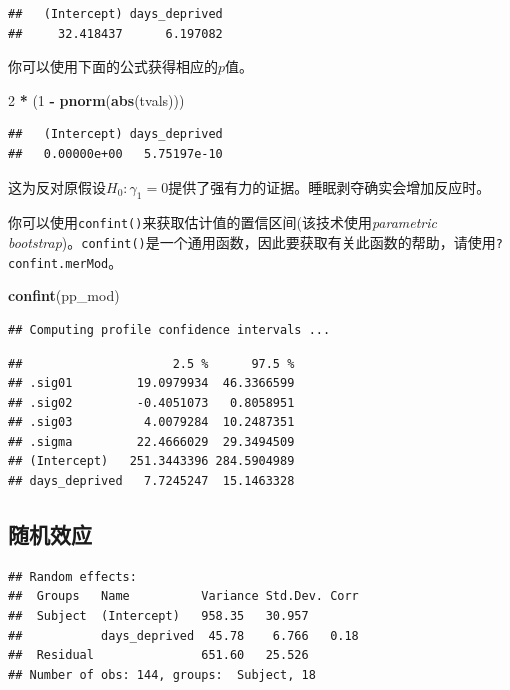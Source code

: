 \documentclass[
]{book}
\newenvironment{Shaded}{\begin{snugshade}}{\end{snugshade}}
\newcommand{\DecValTok}[1]{\textcolor[rgb]{0.00,0.00,0.81}{#1}}
\newcommand{\FunctionTok}[1]{\textcolor[rgb]{0.13,0.29,0.53}{\textbf{#1}}}
\newcommand{\NormalTok}[1]{#1}
\newcommand{\SpecialCharTok}[1]{\textcolor[rgb]{0.81,0.36,0.00}{\textbf{#1}}}
\begin{document}
\begin{verbatim}
##   (Intercept) days_deprived 
##     32.418437      6.197082
\end{verbatim}

你可以使用下面的公式获得相应的\(p\)值。

\begin{Shaded}
\begin{Highlighting}[]
\DecValTok{2} \SpecialCharTok{*}\NormalTok{ (}\DecValTok{1} \SpecialCharTok{{-}} \FunctionTok{pnorm}\NormalTok{(}\FunctionTok{abs}\NormalTok{(tvals)))}
\end{Highlighting}
\end{Shaded}

\begin{verbatim}
##   (Intercept) days_deprived 
##   0.00000e+00   5.75197e-10
\end{verbatim}

这为反对原假设\(H_0: \gamma_1 = 0\)提供了强有力的证据。睡眠剥夺确实会增加反应时。

你可以使用\texttt{confint()}来获取估计值的置信区间(该技术使用\emph{parametric bootstrap})。\texttt{confint()}是一个通用函数，因此要获取有关此函数的帮助，请使用\texttt{?confint.merMod}。

\begin{Shaded}
\begin{Highlighting}[]
\FunctionTok{confint}\NormalTok{(pp\_mod)}
\end{Highlighting}
\end{Shaded}

\begin{verbatim}
## Computing profile confidence intervals ...
\end{verbatim}

\begin{verbatim}
##                     2.5 %      97.5 %
## .sig01         19.0979934  46.3366599
## .sig02         -0.4051073   0.8058951
## .sig03          4.0079284  10.2487351
## .sigma         22.4666029  29.3494509
## (Intercept)   251.3443396 284.5904989
## days_deprived   7.7245247  15.1463328
\end{verbatim}

\hypertarget{ux968fux673aux6548ux5e94}{%
\subsection{随机效应}\label{ux968fux673aux6548ux5e94}}

\begin{verbatim}
## Random effects:
##  Groups   Name          Variance Std.Dev. Corr
##  Subject  (Intercept)   958.35   30.957       
##           days_deprived  45.78    6.766   0.18
##  Residual               651.60   25.526       
## Number of obs: 144, groups:  Subject, 18
\end{verbatim}
\end{document}
